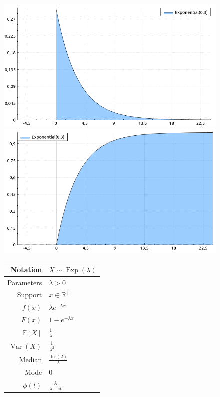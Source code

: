 \documentclass[a4paper,11pt]{article}
\theoremstyle{plain}
\theoremstyle{definition}
\newcommand{\ME}{\mathbb{E}}
\newcommand{\MR}{\mathbb{R}}
\newcommand{\Var}{\operatorname{Var}}
\begin{document}
	\begin{figure}[!htb]\centering
		\begin{minipage}{0.55\textwidth}
			\includegraphics[width=\linewidth, right]{exponential_pdf}
			\captionsetup{labelformat=empty}
			\includegraphics[width=\linewidth, right]{exponential_cdf}
			\captionsetup{labelformat=empty}
		\end{minipage}
		\begin{minipage}{0.4\textwidth}
		\begin{tabular}{| r | l |}
			\hline
			Notation & $X \sim \operatorname{Exp}(\lambda)$ \\
			\hline
			Parameters & $\lambda > 0$ \\
			\hline
			Support & $x \in \MR^+$  \\
			\hline
			$f(x)$ & $\lambda e^{-\lambda x}  $ \\
			\hline
			$F(x)$ & $1-e^{-\lambda x} $\\
			\hline
			$\ME[X]$ & $ \frac{1}{\lambda}$ \\
			\hline
			$\Var(X)$ & $\frac{1}{\lambda^2}$ \\
			\hline
			Median & $\frac{\ln(2)}{\lambda}$ \\
			\hline
			Mode & $0$ \\
			\hline
			$\phi(t)$ & $ \frac{\lambda}{\lambda-it}$ \\
			\hline
		\end{tabular}
		\end{minipage}
	\end{figure}
\end{document}
